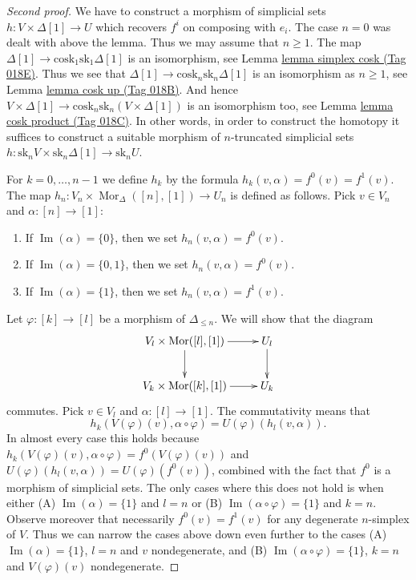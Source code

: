 \documentclass{amsart}
\theoremstyle{plain}
\theoremstyle{definition}
\theoremstyle{remark}
\numberwithin{equation}{subsection}
\def\Mor{\mathop{\mathrm{Mor}}\nolimits}
\def\Im{\mathop{\mathrm{Im}}}
\begin{document}
\begin{proof}[Second proof]
We have to construct a morphism of simplicial sets
$h : V \times \Delta[1] \to U$ which recovers $f^i$ on composing with $e_i$.
The case $n = 0$ was dealt with above the lemma.
Thus we may assume that $n \geq 1$.
The map $\Delta[1] \to \text{cosk}_1 \text{sk}_1 \Delta[1]$
is an isomorphism, see Lemma \href{https://stacks.math.columbia.edu/tag/018E}{lemma simplex cosk (Tag 018E)}.
Thus we see that $\Delta[1] \to \text{cosk}_n \text{sk}_n \Delta[1]$
is an isomorphism as $n \geq 1$, see
Lemma \href{https://stacks.math.columbia.edu/tag/018B}{lemma cosk up (Tag 018B)}. And hence $V \times \Delta[1] \to
\text{cosk}_n \text{sk}_n (V \times \Delta[1])$
is an isomorphism too, see Lemma \href{https://stacks.math.columbia.edu/tag/018C}{lemma cosk product (Tag 018C)}.
In other words, in order to construct the homotopy
it suffices to construct a suitable
morphism of $n$-truncated simplicial sets
$h : \text{sk}_n V \times \text{sk}_n \Delta[1] \to \text{sk}_n U$.

\medskip\noindent
For $k = 0, \ldots, n - 1$ we define $h_k$ by the
formula $h_k(v, \alpha) = f^0(v) = f^1(v)$.
The map $h_n : V_n \times \Mor_{\Delta}([n], [1]) \to U_n$
is defined as follows. Pick $v \in V_n$ and $\alpha : [n] \to [1]$:
\begin{enumerate}
\item If $\Im(\alpha) = \{0\}$, then we set $h_n(v, \alpha) = f^0(v)$.
\item If $\Im(\alpha) = \{0, 1\}$, then we set $h_n(v, \alpha) = f^0(v)$.
\item If $\Im(\alpha) = \{1\}$, then we set $h_n(v, \alpha) = f^1(v)$.
\end{enumerate}
Let $\varphi : [k] \to [l]$ be a morphism of $\Delta_{\leq n}$.
We will show that the diagram
$$
\xymatrix{
V_{l} \times \Mor([l], [1]) \ar[r] \ar[d] & U_{l} \ar[d] \\
V_{k} \times \Mor([k], [1]) \ar[r] & U_{k}
}
$$
commutes.
Pick $v \in V_{l}$ and $\alpha : [l] \to [1]$.
The commutativity means that
$$
h_k(V(\varphi)(v), \alpha \circ \varphi)
=
U(\varphi)(h_l(v, \alpha)).
$$
In almost every case this holds because
$h_k(V(\varphi)(v), \alpha \circ \varphi) = f^0(V(\varphi)(v))$
and $U(\varphi)(h_l(v, \alpha)) = U(\varphi)(f^0(v))$, combined
with the fact that $f^0$ is a morphism of simplicial sets.
The only cases where this does not hold is when
either (A) $\Im(\alpha) = \{1\}$ and $l = n$
or (B) $\Im(\alpha \circ \varphi) = \{1\}$ and $k = n$.
Observe moreover that necessarily $f^0(v) = f^1(v)$
for any degenerate $n$-simplex of $V$.
Thus we can narrow the cases above down even further
to the cases (A) $\Im(\alpha) = \{1\}$, $l = n$
and $v$ nondegenerate, and (B)
$\Im(\alpha \circ \varphi) = \{1\}$, $k = n$
and $V(\varphi)(v)$ nondegenerate.


\end{proof}
\end{document}
